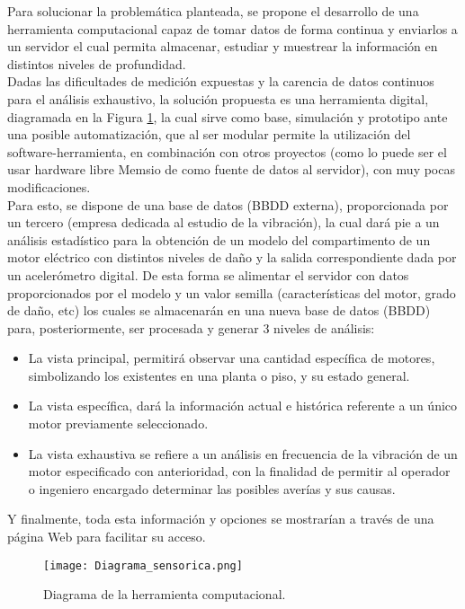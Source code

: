 

Para solucionar la problemática planteada, se propone el desarrollo de una herramienta computacional capaz de tomar datos de forma continua y enviarlos  a un servidor el cual permita  almacenar, estudiar y muestrear la información en distintos niveles de profundidad.\\


Dadas las dificultades de medición expuestas y la carencia de datos continuos para el análisis exhaustivo, la solución propuesta es una herramienta digital, diagramada en la Figura \ref{diagrama}, la cual sirve como base, simulación y prototipo ante  una posible automatización, que al ser modular permite la utilización del software-herramienta, en combinación con otros proyectos (como lo puede ser el usar hardware libre Memsio de \textcite{Koene} como fuente de datos al servidor), con muy pocas modificaciones.\\


Para esto, se dispone de una base de datos (BBDD externa), proporcionada por un tercero (empresa dedicada al estudio de la vibración), la cual dará pie a un análisis estadístico para la obtención de un modelo del compartimento de un motor eléctrico con distintos niveles de daño y la salida correspondiente dada por un acelerómetro digital. De esta forma se alimentar el servidor con datos proporcionados por el modelo y un valor semilla (características del motor, grado de daño, etc) los cuales se almacenarán en una nueva base de datos (BBDD) para, posteriormente, ser procesada y  generar 3 niveles de análisis: \\


\begin{itemize}
\item La vista principal, permitirá observar una cantidad específica de motores, simbolizando los existentes en una planta o piso, y su estado general.

\item La vista específica, dará la información actual e histórica referente a un único motor previamente seleccionado.

\item La vista exhaustiva se refiere a un análisis en frecuencia de la vibración de un motor especificado con anterioridad, con la finalidad de permitir al operador o ingeniero encargado determinar las posibles averías y sus causas.
\end{itemize}


Y finalmente, toda esta información y opciones se mostrarían a través de una página Web para facilitar su acceso.\\



\begin{figure}[htb]
\centering
\caption{Diagrama de la herramienta computacional.}
\label{diagrama}
\texttt{[image: Diagrama\_sensorica.png]}
\end{figure}
